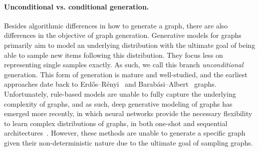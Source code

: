 \paragraph{Unconditional vs. conditional generation.}
Besides algorithmic differences in how to generate a graph, there are also differences in the objective of graph generation.
Generative models for graphs primarily aim to model an underlying distribution with the ultimate goal
of being able to sample new items following this distribution.
They focus less on representing single samples exactly.
As such, we call this branch \emph{unconditional} generation.
This form of generation is mature and well-studied, and the earliest approaches date back to Erd\H{o}s--R\'enyi~\cite{erdos1960evolution} and
Barab\'asi--Albert~\cite{barabasi1999emergence} graphs.
Unfortunately, rule-based models are unable to fully capture the underlying complexity of graphs, and as such,
deep generative modeling of graphs has emerged more recently, in which neural networks provide the necessary
flexibility to learn complex distributions of graphs, in both one-shot and sequential architectures~\cite{vgae,gran,graphrnn}.
However, these methods are unable to generate a specific graph given their non-deterministic nature due to the ultimate goal of sampling
graphs.

